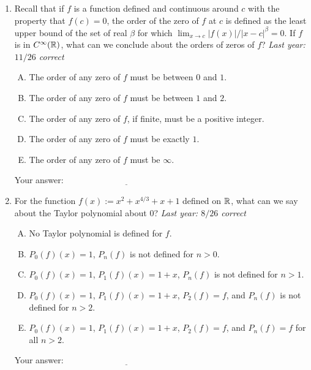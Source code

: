 \documentclass[10pt]{amsart}
\begin{document}
\begin{enumerate}
\item Recall that if $f$ is a function defined and continuous around
  $c$ with the property that $f(c) = 0$, the order of the zero of $f$
  at $c$ is defined as the least upper bound of the set of real $\beta$ for
  which $\lim_{x \to c} |f(x)|/|x - c|^\beta = 0$. If $f$ is in
  $C^{\infty}(\mathbb{R})$, what can we conclude about the orders of zeros of
  $f$? {\em Last year: $11/26$ correct}

  \begin{enumerate}[(A)]
  \item The order of any zero of $f$ must be between $0$ and $1$.
  \item The order of any zero of $f$ must be between $1$ and $2$.
  \item The order of any zero of $f$, if finite, must be a positive
  integer.
  \item The order of any zero of $f$ must be exactly $1$.
  \item The order of any zero of $f$ must be $\infty$.
  \end{enumerate}

  \vspace{0.1in}
  Your answer: $\underline{\qquad\qquad\qquad\qquad\qquad\qquad\qquad}$
  \vspace{0.15in}

\item For the function $f(x) := x^2 + x^{4/3} + x + 1$ defined on
  $\mathbb{R}$, what can we say about the Taylor polynomial about $0$? {\em
  Last year: $8/26$ correct}

  \begin{enumerate}[(A)]
  \item No Taylor polynomial is defined for $f$.
  \item $P_0(f)(x) = 1$, $P_n(f)$ is not defined for $n > 0$.
  \item $P_0(f)(x) = 1$, $P_1(f)(x) = 1 + x$, $P_n(f)$ is not defined
    for $n > 1$.
  \item $P_0(f)(x) = 1$, $P_1(f)(x) = 1 + x$, $P_2(f) = f$, and
    $P_n(f)$ is not defined for $n > 2$.
  \item $P_0(f)(x) = 1$, $P_1(f)(x) = 1 + x$, $P_2(f) = f$, and
    $P_n(f) = f$ for all $n > 2$.
  \end{enumerate}

  \vspace{0.1in}
  Your answer: $\underline{\qquad\qquad\qquad\qquad\qquad\qquad\qquad}$
  \vspace{0.15in}


\end{enumerate}
\end{document}

